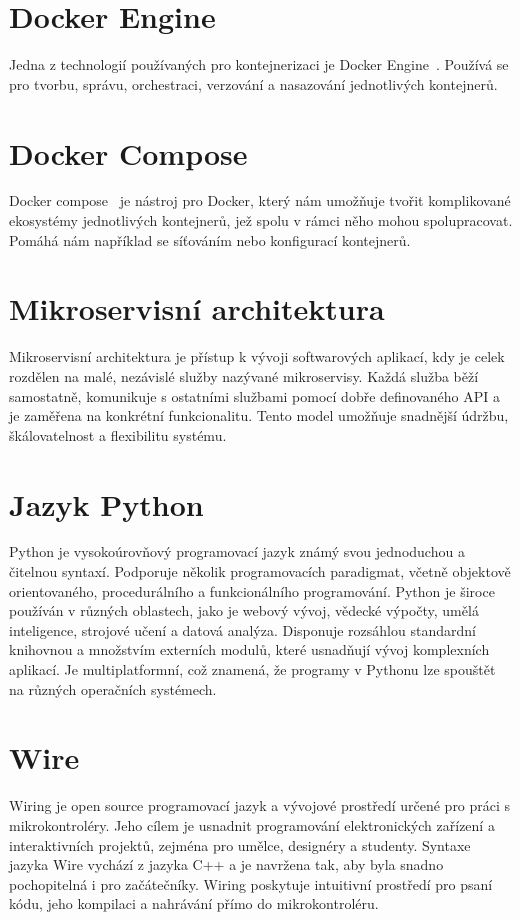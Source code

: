 \section*{Docker Engine}\label{sec:docker-engine}
Jedna z technologií používaných pro kontejnerizaci je Docker Engine~\cite{kontejnerizace-docker}.
Používá se pro tvorbu, správu, orchestraci, verzování a nasazování jednotlivých kontejnerů.

\section*{Docker Compose}\label{sec:docker-compose}
Docker compose~\cite{kontejnerizace-docker-compose} je nástroj pro Docker, který nám umožňuje tvořit komplikované ekosystémy jednotlivých kontejnerů, jež spolu v rámci něho mohou spolupracovat.
Pomáhá nám například se síťováním nebo konfigurací kontejnerů.


\section*{Mikroservisní architektura}\label{sec:microservice-architecture}
Mikroservisní architektura je přístup k vývoji softwarových aplikací, kdy je celek rozdělen na malé, nezávislé služby nazývané mikroservisy.
Každá služba běží samostatně, komunikuje s ostatními službami pomocí dobře definovaného API a je zaměřena na konkrétní funkcionalitu.
Tento model umožňuje snadnější údržbu, škálovatelnost a flexibilitu systému.


\section*{Jazyk Python}\label{sec:python}
Python je vysokoúrovňový programovací jazyk známý svou jednoduchou a čitelnou syntaxí.
Podporuje několik programovacích paradigmat, včetně objektově orientovaného, procedurálního a funkcionálního programování.
Python je široce používán v různých oblastech, jako je webový vývoj, vědecké výpočty, umělá inteligence, strojové učení a datová analýza.
Disponuje rozsáhlou standardní knihovnou a množstvím externích modulů, které usnadňují vývoj komplexních aplikací.
Je multiplatformní, což znamená, že programy v Pythonu lze spouštět na různých operačních systémech.


\section*{Wire}\label{sec:wiring}
Wiring je open source programovací jazyk a vývojové prostředí určené pro práci s mikrokontroléry.
Jeho cílem je usnadnit programování elektronických zařízení a interaktivních projektů, zejména pro umělce, designéry a studenty.
Syntaxe jazyka Wire vychází z jazyka C++ a je navržena tak, aby byla snadno pochopitelná i pro začátečníky.
Wiring poskytuje intuitivní prostředí pro psaní kódu, jeho kompilaci a nahrávání přímo do mikrokontroléru.

